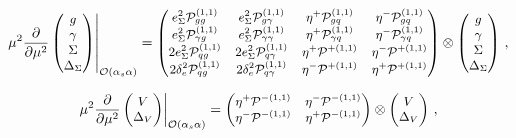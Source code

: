 \newpage
\begin{widetext}
\begin{equation}
\small
\displaystyle\left.\mu^2\frac{\partial}{\partial \mu^2}
\begin{pmatrix}
g\\
\gamma\\
\Sigma\\
\Delta_\Sigma
\end{pmatrix}
\right|_{\mathcal{O}(\alpha_s \alpha)} =
 \displaystyle \begin{pmatrix}
e_\Sigma^2 \mathcal{P}^{(1,1)}_{gg}      & e_\Sigma^2 \mathcal{P}^{(1,1)}_{g\gamma} & \eta^+\mathcal{P}^{(1,1)}_{gq} & \eta^-\mathcal{P}^{(1,1)}_{gq} \\
e_\Sigma^2 \mathcal{P}^{(1,1)}_{\gamma g} & e_\Sigma^2 \mathcal{P}^{(1,1)}_{\gamma\gamma} & \eta^+\mathcal{P}^{(1,1)}_{\gamma q} &\eta^-\mathcal{P}^{(1,1)}_{\gamma q} \\
2 e_\Sigma^2 \mathcal{P}^{(1,1)}_{qg}    & 2 e_\Sigma^2 \mathcal{P}^{(1,1)}_{q\gamma} & \eta^+\mathcal{P}^{+(1,1)}  & \eta^-\mathcal{P}^{+(1,1)}\\
2 \delta_e^2 \mathcal{P}^{(1,1)}_{qg} & 2 \delta_e^2 \mathcal{P}^{(1,1)}_{q\gamma} &\eta^-\mathcal{P}^{+(1,1)} &\eta^+\mathcal{P}^{+(1,1)}
\end{pmatrix}\otimes
\begin{pmatrix}
g\\
\gamma\\
\Sigma\\
\Delta_\Sigma
\end{pmatrix}\,,
\end{equation}

\begin{equation}
\small
\displaystyle\left.\mu^2\frac{\partial}{\partial \mu^2}
\begin{pmatrix}
V\\
\Delta_V
\end{pmatrix} \right|_{\mathcal{O}(\alpha_s \alpha)}= 
\begin{pmatrix}
\eta^+\mathcal{P}^{-(1,1)} & \eta^-\mathcal{P}^{-(1,1)} \\
\eta^-\mathcal{P}^{-(1,1)} & \eta^+\mathcal{P}^{-(1,1)} 
\end{pmatrix}\otimes
\begin{pmatrix}
V\\
\Delta_V
\end{pmatrix}\,,
\end{equation}


\end{widetext}
